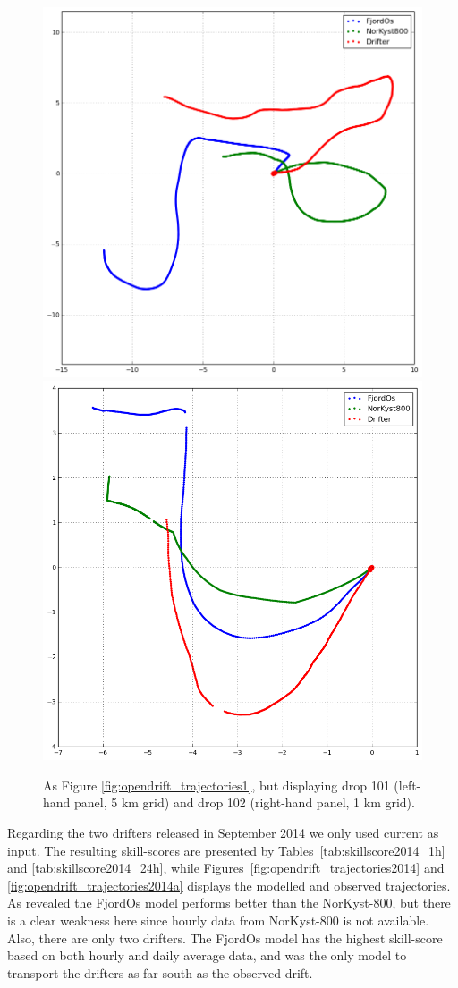 \begin{figure}[htb]
	\centerline{
		\includegraphics*[width=.5\textwidth]{Figurer/opendrift/skillscore/drop101i6}
		\includegraphics*[width=.5\textwidth]{Figurer/opendrift/skillscore/drop102i9}
		}
	\caption{\small As Figure \ref{fig:opendrift_trajectories1}, but displaying drop 101 (left-hand panel, 5 km grid) and drop 102 (right-hand panel, 1 km grid).}
	\label{fig:opendrift_trajectories3}
\end{figure}

Regarding the two drifters released in September 2014 we only used current as input. The resulting skill-scores are presented by Tables~\ref{tab:skillscore2014_1h} and \ref{tab:skillscore2014_24h}, while Figures~\ref{fig:opendrift_trajectories2014} and \ref{fig:opendrift_trajectories2014a} displays the modelled and observed trajectories. As revealed the FjordOs model performs better than the NorKyst-800, but there is a clear weakness here since hourly data from NorKyst-800 is not available. Also, there are only two drifters. The FjordOs model has the highest skill-score based on both hourly and daily average data, and was the only model to transport the drifters as far south as the observed drift. 

